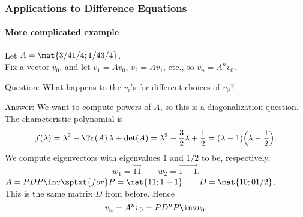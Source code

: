 
\begin{frame}
\frametitle{Applications to Difference Equations}
\framesubtitle{More complicated example}

Let $A = \mat{3/4 1/4; 1/4 3/4}$.\\[2mm]
Fix a vector $v_0$, and let
$v_1 = Av_0,\, v_2=Av_1$, etc., so
$v_n = A^nv_0$.

\pause\medskip
\alert{Question:} What happens to the $v_i$'s for different choices of $v_0$?

\medskip
\begin{webonly}
\alert{Answer:} We want to compute powers of $A$, so this is a diagonalization
question.  The characteristic polynomial is
\[ f(\lambda) = \lambda^2 - \Tr(A)\,\lambda + \det(A)
= \lambda^2 - \frac 32\lambda + \frac 12
= (\lambda-1)\Bigl(\lambda-\frac 12\Bigr). \]
We compute eigenvectors with eigenvalues $1$ and $1/2$ to be, respectively,
\[ w_1 = \vec{1 1} \qquad w_2 = \vec{1 -1}. \]
\hfill\qquad
$A = PDP\inv \sptxt{for} P = \mat{1 1; 1 -1} \qquad D = \mat{1 0; 0 1/2}$.%
\hfill\null\\[1mm]
This is the same matrix $D$ from before.  Hence
\[ v_n = A^nv_0 = PD^nP\inv v_0. \]
\end{webonly}

\end{frame}




